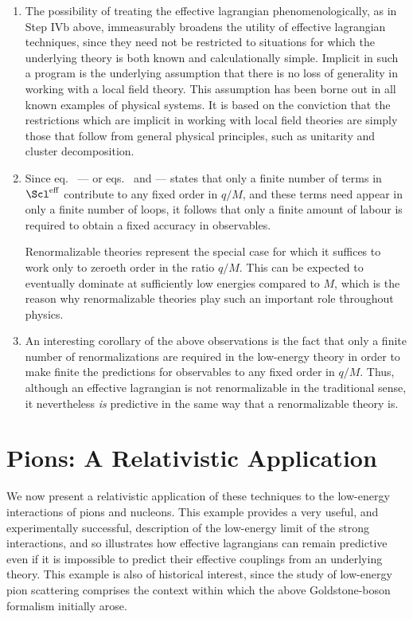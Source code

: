 \documentclass[12pt]{report}
\def\leff{\Scl^{\rm eff}}
\begin{document}
\begin{enumerate}

\item
The possibility of treating the effective lagrangian
phenomenologically, as in Step IVb above, immeasurably
broadens the utility of effective lagrangian techniques,
since they need not be restricted to situations for which
the underlying theory is both known and calculationally
simple. Implicit in such a program is the underlying
assumption that there is no loss of generality in working
with a local field theory. This assumption has been borne
out in all known examples of physical systems. It is based
on the conviction that the restrictions which are implicit
in working with local field theories are simply those that
follow from general physical principles, such as unitarity
and cluster decomposition.

\item
Since eq.~ --- or 
eqs.~ and 
 --- states that only a finite
number of terms in $\leff$ contribute to any fixed order in
$q/M$, and these terms need appear in only a finite number
of loops, it follows that only a finite amount of labour is
required to obtain a fixed accuracy in observables.

Renormalizable theories represent the special case for
which it suffices to work only to zeroeth order in the
ratio $q/M$. This can be expected to eventually
dominate at sufficiently low energies compared to
$M$, which is the reason why renormalizable 
theories play such an important role throughout 
physics.

\item
An interesting corollary of the above observations is the
fact that only a finite number of renormalizations are
required in the low-energy theory in order to make finite
the predictions for observables to any fixed order in
$q/M$. Thus, although an effective lagrangian is not
renormalizable in the traditional sense, it nevertheless
{\em is} predictive in the same way that a renormalizable
theory is.

\end{enumerate}


\chapter{Pions: A Relativistic Application}

We now present a relativistic application of these
techniques to the low-energy interactions of pions and
nucleons. This example provides a very useful, and
experimentally successful, description of the low-energy
limit of the strong interactions, and so illustrates how
effective lagrangians can remain predictive even if it is
impossible to predict their effective couplings from an
underlying theory. This example is also of historical
interest, since the study of low-energy pion scattering
comprises the context within which the above
Goldstone-boson formalism initially arose.
\end{document}
